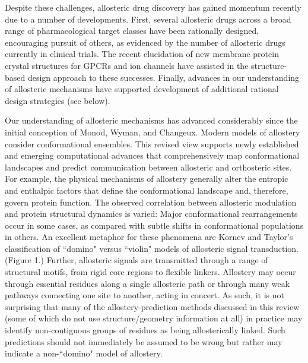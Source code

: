 \par Despite these challenges, allosteric drug discovery  has  gained momentum recently due to a number of developments.\cite{Wenthur2014} First, several allosteric drugs across a broad range of pharmacological target classes have been rationally designed,\cite{Saalau-bethell2012,Rawal2012,Reynolds2012,Gentry2015,Regan2015,Lugowska2015a,Meng2015} encouraging pursuit of others, as evidenced by the number of allosteric drugs currently in clinical trials.\cite{Wu2015c} The recent elucidation of new membrane protein crystal structures for GPCRs\cite{Jazayeri2015,Tautermann2014} and ion channels\cite{Karakas2014c,Sciara2012a} have assisted in the structure-based  design approach to these successes. Finally, advances in our understanding of allosteric mechanisms have supported development of additional rational design strategies (see below).
\par Our understanding of allosteric mechanisms has advanced considerably since the initial conception of Monod, Wyman, and Changeux.\cite{Monod1965a} Modern models of allostery consider conformational ensembles.\cite{Gunasekaran2004a,Weber1972,Cooper1984a,Jardetzky1996,Kumar2000,Kern2003,Tsai2008a,Boehr2009,Kar2010,Zhou2010b,Nussinov2012a,Nussinov2014a,Changeux2012,Ma2014a,Greives2014,Guo2015a,Motlagh2014a} This revised view supports newly established and emerging computational advances that comprehensively map conformational landscapes and predict communication between allosteric and orthosteric sites. For example, the physical mechanisms of allostery generally alter the entropic and enthalpic factors that define the conformational landscape and, therefore, govern protein function.\cite{Gunasekaran2004a,Nussinov2012a,Ma2014a} The observed correlation between allosteric modulation and protein structural dynamics is varied: Major conformational rearrangements occur in some cases, as compared with subtle shifts in conformational populations in others.\cite{Tsai2008a,Tsai2009,Kar2010,Nussinov2012a,Gunasekaran2004a,Kenakin2010a,Wenthur2014,Szilagyi2013a} An excellent metaphor for these phenomena are Kornev and Taylor’s classification of ``domino" versus ``violin" models of allosteric signal transduction.\cite{Kornev2015a} (Figure 1.) Further, allosteric signals are transmitted through a range of structural motifs, from rigid core regions to flexible linkers.\cite{Ma2011a} Allostery may occur through essential residues along a single allosteric path\cite{DelSol2006} or through many weak pathways connecting one site to another, acting in concert.\cite{DelSol2009b} As such, it is not surprising that many of the allostery-prediction methods discussed in this review (some of which do not use structure/geometry information at all) in practice may identify non-contiguous groups of residues as being allosterically linked. Such predictions should not immediately be assumed to be wrong but rather may indicate a non-``domino" model of allostery.


